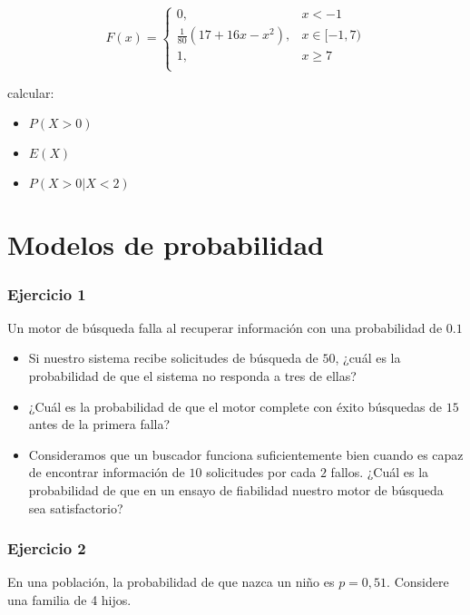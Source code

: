 \documentclass[
]{book}
\providecommand{\tightlist}{%
  \setlength{\itemsep}{0pt}\setlength{\parskip}{0pt}}
\begin{document}
\[
    F(x)= 
\begin{cases}
0, & x  < -1 \\
\frac{1}{80}(17+16x-x^2),& x \in [-1,7)\\
1,& x \geq 7\\
\end{cases}
\]

calcular:

\begin{itemize}
\tightlist
\item
  \(P(X>0)\)
\item
  \(E(X)\)
\item
  \(P(X>0|X<2)\)
\end{itemize}

\hypertarget{modelos-de-probabilidad}{%
\section{Modelos de probabilidad}\label{modelos-de-probabilidad}}

\hypertarget{ejercicio-1-4}{%
\subsubsection{Ejercicio 1}\label{ejercicio-1-4}}

Un motor de búsqueda falla al recuperar información con una probabilidad de \(0.1\)

\begin{itemize}
\item
  Si nuestro sistema recibe solicitudes de búsqueda de \(50\), ¿cuál es la probabilidad de que el sistema no responda a tres de ellas?
\item
  ¿Cuál es la probabilidad de que el motor complete con éxito búsquedas de \(15\) antes de la primera falla?
\item
  Consideramos que un buscador funciona suficientemente bien cuando es capaz de encontrar información de \(10\) solicitudes por cada \(2\) fallos. ¿Cuál es la probabilidad de que en un ensayo de fiabilidad nuestro motor de búsqueda sea satisfactorio?
\end{itemize}

\hypertarget{ejercicio-2-4}{%
\subsubsection{Ejercicio 2}\label{ejercicio-2-4}}

En una población, la probabilidad de que nazca un niño es \(p=0,51\). Considere una familia de 4 hijos.
\end{document}
